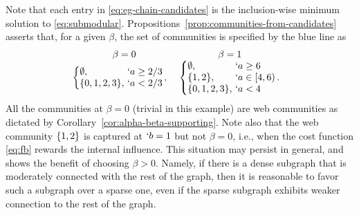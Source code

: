 \begin{example}
	Note that each entry in \eqref{eq:eg-chain-candidates} is the inclusion-wise minimum solution to
	\eqref{eq:submodular}. 
	Propositions~\ref{prop:communities-from-candidates} asserts that, for a given $\beta$, the set of
	communities is specified by the blue line as 
	\begin{align}
		\label{eq:eg-chain}
		\begin{array}{c@{\quad}c}
			 \beta = 0 & \beta = 1 \\%
			\!\!
			\!\!
			\left\{
				\!\!\!
				\begin{array}{l@{\ }l}
					\emptyset, & `a \geq  2/3 
					\\
					\Set{0,1,2,3}, & `a < 2/3
				\end{array}\!\!,
			\right.
			&
			\left\{
				\!\!\!
				\begin{array}{l@{\ }l}
					\emptyset, & `a \geq 6
					\\
					\Set{1,2}, & `a \in  [4, 6)
					\\
					\Set{0,1,2,3}, & `a < 4
				\end{array}\!\!.
			\right.
		\end{array}
	\end{align}
	All the communities at $\beta = 0$ (trivial in this example) are web communities as
	dictated by Corollary~\ref{cor:alpha-beta-supporting}.
	Note also that
	the web community $\{1,2\}$ is captured at $`b = 1$ but not $\beta=0$, i.e., when the cost
	function \eqref{eq:fb} rewards the internal influence.
	This situation may persist in general, and shows the benefit of choosing $\beta > 0$.  Namely, if
	there is a dense subgraph that is moderately connected with the rest of the graph, then it is
	reasonable to favor such a subgraph over a sparse one, even if the sparse subgraph exhibits
	weaker connection to the rest of the graph. 
	

\end{example}

